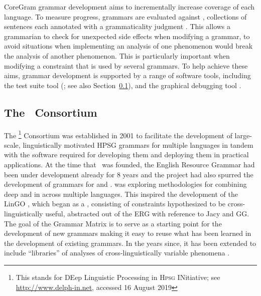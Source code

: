 \documentclass[output=paper,nonflat]{langsci/langscibook}
\begin{document}
CoreGram grammar development aims to incrementally increase coverage of each language.
To measure progress, grammars are evaluated against ,
collections of sentences each annotated with a grammaticality judgment \citep{ONK97a,Mueller2004f}.
This allows a grammarian to check for unexpected side effects when modifying a grammar,
to avoid situations when implementing an analysis of one phenomenon
would break the analysis of another phenomenon.
This is particularly important when modifying a constraint that is used by several grammars.
To help achieve these aims, grammar development is supported by a range of software tools,
including the test suite tool \itsdb\is{\itsdb} (\citealp{Oepen:01}; see also Section~\ref{cl:delphin}),
and the graphical debugging tool  \citep{DER2010a-u,DER2013a}.

\subsection{The \delphin\ Consortium}
\label{cl:delphin}


The \delphin\footnote{This stands for DEep Linguistic
  Processing in \textsc{Hpsg} INitiative; see \url{http://www.delph-in.net}, accessed 16 August 2019} Consortium
was established in 2001 to facilitate the development of large-scale,
linguistically motivated HPSG grammars for multiple languages in tandem
with the software required for developing them and deploying them in
practical applications. At the time that \delphin\ was founded, the
English Resource Grammar
\citep[ERG;][]{Flickinger2000a,Flickinger2011a-u} had been under
development already for 8 years and the  project
\citep{Wahlster2000a-ed} had also spurred the development of grammars for
 \citep[GG;][]{MK2000a-cr,Crysmann2003b} and 
\citep*[Jacy;][]{SBB2016a}. 
\citep*{Callmeier-etal:2004} was exploring methodologies for combining
deep and  in  across multiple
languages. This inspired the development of the LinGO 
\citep*{BFO2002a-u}, which began as a , consisting of
constraints hypothesized to be cross-linguistically useful, abstracted
out of the ERG with reference to Jacy and GG. The goal of the Grammar
Matrix is to serve as a starting point for the development of new
grammars making it easy to reuse what has been learned in the
development of existing grammars. In the years since, it has been
extended to include ``libraries'' of analyses of cross-linguistically
variable phenomena \citep[e.g.,][]{Drellishak2009a-u,BDFPS2010a-u}.
\end{document}

